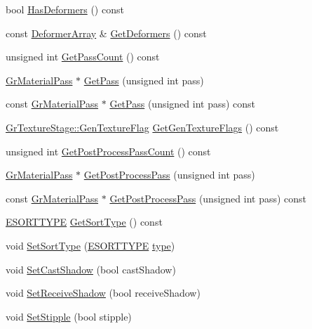 \begin{CompactItemize}
\begin{CompactItemize}
\item 
bool \hyperlink{class_gr_material_209457388b0f29c4d36089d6c3bffd3a}{HasDeformers} () const 
\item 
const \hyperlink{class_u_fast_array}{DeformerArray} \& \hyperlink{class_gr_material_9d986c1ed00c9c7f3212c9d1f1233582}{GetDeformers} () const 
\item 
unsigned int \hyperlink{class_gr_material_c5afd8886b80a26cb67430eb48ba8bf7}{GetPassCount} () const 
\item 
\hyperlink{class_gr_material_pass}{GrMaterialPass} $\ast$ \hyperlink{class_gr_material_d1d9f753c4b3875f7d2b361bcf8cf99a}{GetPass} (unsigned int pass)
\item 
const \hyperlink{class_gr_material_pass}{GrMaterialPass} $\ast$ \hyperlink{class_gr_material_8be12969be7c362332fe9ccf19b0c367}{GetPass} (unsigned int pass) const 
\item 
\hyperlink{class_gr_texture_stage_60f59a039bf1c95b76659752ff1bf7d6}{GrTextureStage::GenTextureFlag} \hyperlink{class_gr_material_7751843be737d70abaf404d4955c9000}{GetGenTextureFlags} () const 
\item 
unsigned int \hyperlink{class_gr_material_ec2234608525b1f9b306990871cd984a}{GetPostProcessPassCount} () const 
\item 
\hyperlink{class_gr_material_pass}{GrMaterialPass} $\ast$ \hyperlink{class_gr_material_41f016d8810c0dddd346de241ef18a4f}{GetPostProcessPass} (unsigned int pass)
\item 
const \hyperlink{class_gr_material_pass}{GrMaterialPass} $\ast$ \hyperlink{class_gr_material_f0cd019c82baf63e7a837b400486e31e}{GetPostProcessPass} (unsigned int pass) const 
\item 
\hyperlink{class_gr_material_0277ae85793f8cce8f8e3939fb5540e9}{ESORTTYPE} \hyperlink{class_gr_material_2ead7b081144beb220be74c2516d9832}{GetSortType} () const 
\item 
void \hyperlink{class_gr_material_30d3155b74b31be33ecf73b341743303}{SetSortType} (\hyperlink{class_gr_material_0277ae85793f8cce8f8e3939fb5540e9}{ESORTTYPE} \hyperlink{glext__bak_8h_7d05960f4f1c1b11f3177dc963a45d86}{type})
\item 
void \hyperlink{class_gr_material_a45596ed0f7f0ddfffcde7169f7a4975}{SetCastShadow} (bool castShadow)
\item 
void \hyperlink{class_gr_material_31e817784139a59b314f36f761ea0031}{SetReceiveShadow} (bool receiveShadow)
\item 
void \hyperlink{class_gr_material_a6b79d8b969bce300de861d05bd94907}{SetStipple} (bool stipple)

\end{CompactItemize}
\end{CompactItemize}

